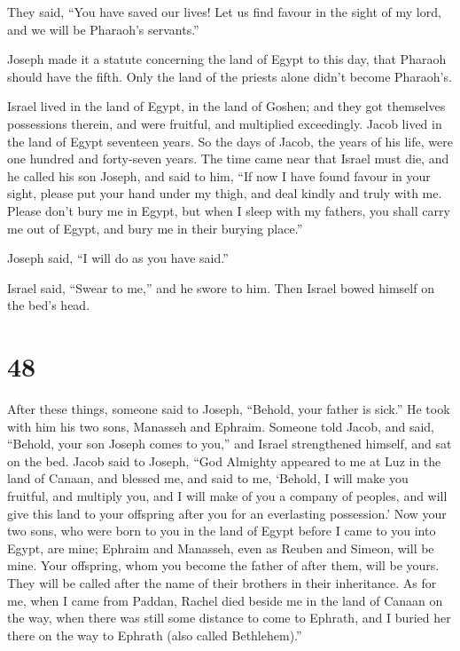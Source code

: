  They said, ``You have saved our lives! Let us find
favour in the sight of my lord, and we will be Pharaoh's servants.''

 Joseph made it a statute concerning the land of Egypt to
this day, that Pharaoh should have the fifth. Only the land of the
priests alone didn't become Pharaoh's.

 Israel lived in the land of Egypt, in the land of
Goshen; and they got themselves possessions therein, and were fruitful,
and multiplied exceedingly.  Jacob lived in the land of
Egypt seventeen years. So the days of Jacob, the years of his life, were
one hundred and forty-seven years.  The time came near
that Israel must die, and he called his son Joseph, and said to him,
``If now I have found favour in your sight, please put your hand under
my thigh, and deal kindly and truly with me. Please don't bury me in
Egypt,  but when I sleep with my fathers, you shall carry
me out of Egypt, and bury me in their burying place.''

Joseph said, ``I will do as you have said.''

 Israel said, ``Swear to me,'' and he swore to him. Then
Israel bowed himself on the bed's head.

\hypertarget{section-47}{%
\section{48}\label{section-47}}

 After these things, someone said to Joseph, ``Behold,
your father is sick.'' He took with him his two sons, Manasseh and
Ephraim.  Someone told Jacob, and said, ``Behold, your son
Joseph comes to you,'' and Israel strengthened himself, and sat on the
bed.  Jacob said to Joseph, ``God Almighty appeared to me
at Luz in the land of Canaan, and blessed me,  and said to
me, `Behold, I will make you fruitful, and multiply you, and I will make
of you a company of peoples, and will give this land to your offspring
after you for an everlasting possession.'  Now your two
sons, who were born to you in the land of Egypt before I came to you
into Egypt, are mine; Ephraim and Manasseh, even as Reuben and Simeon,
will be mine.  Your offspring, whom you become the father
of after them, will be yours. They will be called after the name of
their brothers in their inheritance.  As for me, when I
came from Paddan, Rachel died beside me in the land of Canaan on the
way, when there was still some distance to come to Ephrath, and I buried
her there on the way to Ephrath (also called Bethlehem).''

